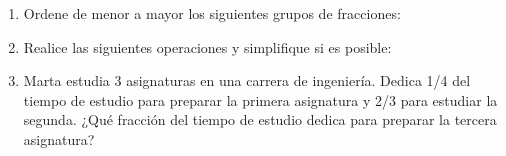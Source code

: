 \documentclass[fleqn]{article}
\begin{document}
\begin{enumerate}
\item Ordene de menor a mayor los siguientes grupos de fracciones:
\begin{enumerate}
\end{enumerate}
\item Realice las siguientes operaciones y simplifique si es posible:
\begin{enumerate}
\end{enumerate}
\item Marta estudia 3 asignaturas en una carrera de ingeniería. Dedica 1/4 del tiempo de estudio para preparar la primera asignatura y 2/3 para estudiar la segunda. ¿Qué fracción del tiempo de estudio dedica para preparar la tercera asignatura?
 \end{enumerate}
\end{document}
